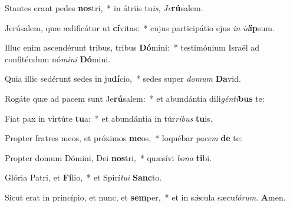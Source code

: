 \setcounter{versecount}{2}

\vs Stantes erant pedes \textbf{nos}tri,~* in átriis tu\textit{is}, \textit{Je}\textbf{rú}salem.

\vs Jerúsalem, quæ ædificátur ut \textbf{cí}vitas:~* cujus participátio ejus \textit{in} \textit{id}\textbf{íp}sum.

\vs Illuc enim ascendérunt tribus, tribus \textbf{Dó}mini:~* testimónium Israël ad confiténdum nó\textit{mi}\textit{ni} \textbf{Dó}mini.

\vs Quia illic sedérunt sedes in ju\textbf{dí}cio,~* sedes super \textit{do}\textit{mum} \textbf{Da}vid.

\vs Rogáte quæ ad pacem sunt Je\textbf{rú}salem:~* et abundántia dili\textit{gén}\textit{ti}\textbf{bus} te:

\vs Fiat pax in virtúte \textbf{tu}a:~* et abundántia in túr\textit{ri}\textit{bus} \textbf{tu}is.

\vs Propter fratres meos, et próximos \textbf{me}os,~* loquébar \textit{pa}\textit{cem} \textbf{de} te:

\vs Propter domum Dómini, Dei \textbf{nos}tri,~* quæsívi \textit{bo}\textit{na} \textbf{ti}bi.

\vs Glória Patri, et \textbf{Fí}lio,~* et Spirí\textit{tu}\textit{i} \textbf{Sanc}to.

\vs Sicut erat in princípio, et nunc, et \textbf{sem}per,~* et in sǽcula sæcu\textit{ló}\textit{rum}. \textbf{A}men.

